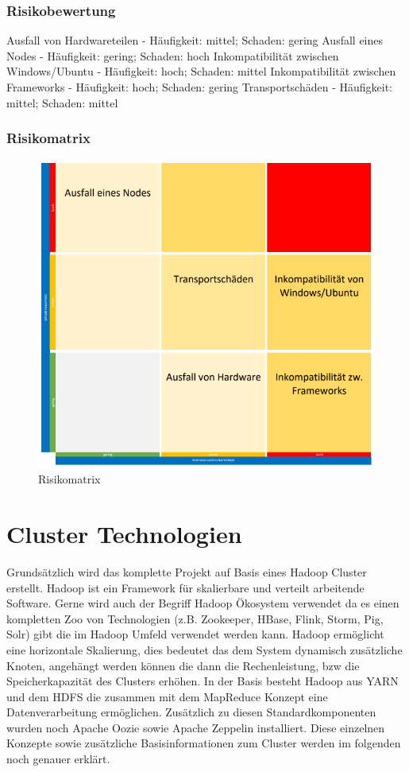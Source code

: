 \documentclass[12pt,oneside,a4paper,parskip]{scrbook}
\begin{document}
\subsection{Risikobewertung}
Ausfall von Hardwareteilen - Häufigkeit: mittel; Schaden: gering
Ausfall eines Nodes - Häufigkeit: gering; Schaden: hoch
Inkompatibilität zwischen Windows/Ubuntu - Häufigkeit: hoch; Schaden: mittel
Inkompatibilität zwischen Frameworks - Häufigkeit: hoch; Schaden: gering
Transportschäden - Häufigkeit: mittel; Schaden: mittel
\subsection{Risikomatrix}
\begin{figure}[h!]
\caption{Risikomatrix}
\label{risikoMatrix}
\centering
\includegraphics[scale=1.0]{pictures/risikoanalyse.png}
\end{figure}


\chapter{Cluster Technologien}
Grunds\"atzlich wird das komplette Projekt auf Basis eines Hadoop Cluster erstellt. Hadoop ist ein Framework f\"ur skalierbare und verteilt arbeitende Software. Gerne wird auch der Begriff  Hadoop \"Okosystem verwendet da es einen kompletten Zoo von Technologien (z.B. Zookeeper, HBase, Flink, Storm, Pig, Solr) gibt die im Hadoop Umfeld verwendet werden kann. Hadoop erm\"oglicht eine horizontale Skalierung, dies bedeutet das dem System dynamisch zus\"atzliche Knoten, angeh\"angt werden k\"onnen die dann die Rechenleistung, bzw die Speicherkapazit\"at des Clusters erh\"ohen. In der Basis besteht Hadoop aus YARN und dem HDFS die zusammen mit dem MapReduce Konzept eine Datenverarbeitung erm\"oglichen. Zus\"atzlich zu diesen Standardkomponenten wurden noch Apache Oozie sowie Apache Zeppelin installiert. Diese einzelnen Konzepte sowie zus\"atzliche Basisinformationen zum Cluster werden im folgenden noch genauer erkl\"art.
\end{document}
